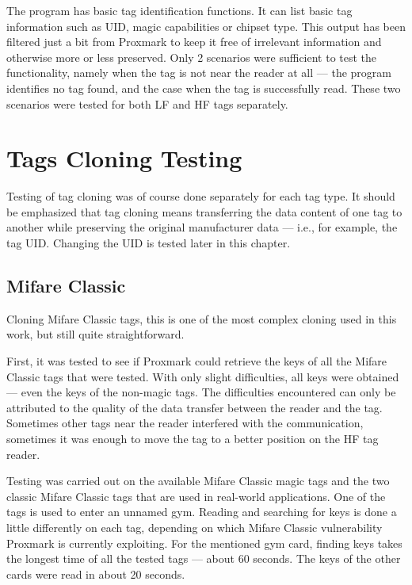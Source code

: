 The program has basic tag identification functions. It can list basic tag information such as UID, magic capabilities or chipset type. This output has been filtered just a bit from Proxmark to keep it free of irrelevant information and otherwise more or less preserved. Only 2 scenarios were sufficient to test the functionality, namely when the tag is not near the reader at all --- the program identifies no tag found, and the case when the tag is successfully read. These two scenarios were tested for both LF and HF tags separately.

\section{Tags Cloning Testing}
Testing of tag cloning was of course done separately for each tag type. It should be emphasized that tag cloning means transferring the data content of one tag to another while preserving the original manufacturer data --- i.e., for example, the tag UID. Changing the UID is tested later in this chapter.

\subsection{Mifare Classic}
\label{subsec:mifareclassiccloning}

Cloning Mifare Classic tags, this is one of the most complex cloning used in this work, but still quite straightforward. 

First, it was tested to see if Proxmark could retrieve the keys of all the Mifare Classic tags that were tested. With only slight difficulties, all keys were obtained --- even the keys of the non-magic tags. The difficulties encountered can only be attributed to the quality of the data transfer between the reader and the tag. Sometimes other tags near the reader interfered with the communication, sometimes it was enough to move the tag to a better position on the HF tag reader.

Testing was carried out on the available Mifare Classic magic tags and the two classic Mifare Classic tags that are used in real-world applications. One of the tags is used to enter an unnamed gym. Reading and searching for keys is done a little differently on each tag, depending on which Mifare Classic vulnerability Proxmark is currently exploiting. For the mentioned gym card, finding keys takes the longest time of all the tested tags --- about 60 seconds. The keys of the other cards were read in about 20 seconds.

